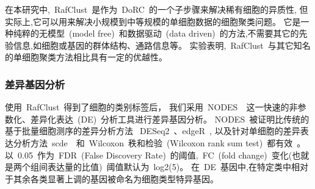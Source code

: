 在本研究中,~RafClust~是作为~DoRC~的一个子步骤来解决稀有细胞的异质性,
但实际上,它可以用来解决小规模到中等规模的单细胞数据的细胞聚类问题。
它是一种纯粹的无模型~(model free)~和数据驱动~(data driven)~的方法,不需要其它的先验信息,如细胞或基因的群体结构、通路信息等。
实验表明,~RafClust~与其它知名的单细胞聚类方法相比具有一定的优越性。

\subsubsection{差异基因分析}
\label{subsec:de}

使用~RafClust~得到了细胞的类别标签后，
我们采用~NODES~\cite{Sengupta049734}~这一快速的非参数化、差异化表达~(DE)~分析工具进行差异基因分析。
NODES~被证明比传统的基于批量细胞测序的差异分析方法~DESeq2~\cite{love2014moderated}、edgeR~\cite{robinson2010edger},
以及针对单细胞的差异表达分析方法~scde~\cite{kharchenko2014bayesian}~和~Wilcoxon~秩和检验~(Wilcoxon rank sum test)~都有效~\cite{Sengupta049734}。
以~0.05~作为~FDR~(False Discovery Rate)~的阈值,~FC~(fold change)~变化(也就是两个组间表达量的比值)~阈值默认为~log2(5)。
在~DE~基因中,在特定类中相对于其余各类显著上调的基因被命名为细胞类型特异基因。

